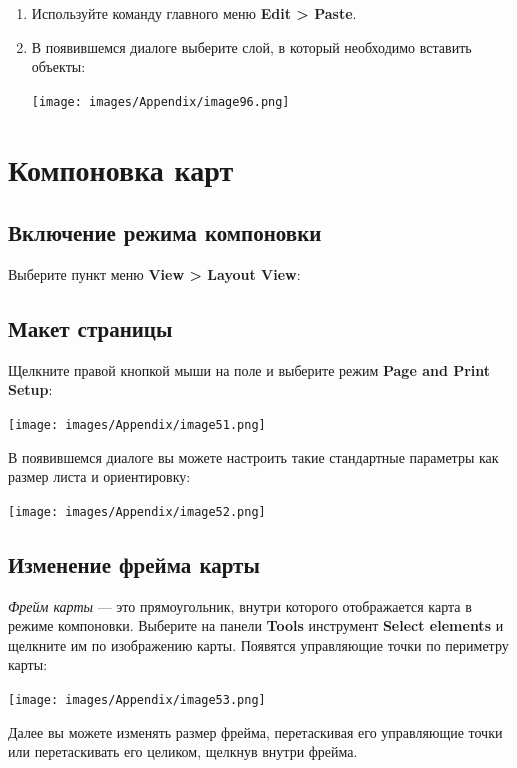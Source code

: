 \documentclass[12pt,]{book}
\begin{document}
\begin{enumerate}
\def\labelenumi{\arabic{enumi}.}
\item
  Используйте команду главного меню \textbf{Edit \textgreater{} Paste}.
\item
  В появившемся диалоге выберите слой, в который необходимо вставить объекты:

  \texttt{[image: images/Appendix/image96.png]}
\end{enumerate}

\hypertarget{manual-layout}{%
\chapter{Компоновка карт}\label{manual-layout}}

\hypertarget{section-47}{%
\section{Включение режима компоновки}\label{section-47}}

Выберите пункт меню \textbf{View \textgreater{} Layout View}:

\hypertarget{section-48}{%
\section{Макет страницы}\label{section-48}}

Щелкните правой кнопкой мыши на поле и выберите режим \textbf{Page and Print Setup}:

\texttt{[image: images/Appendix/image51.png]}

В появившемся диалоге вы можете настроить такие стандартные параметры как размер листа и ориентировку:

\texttt{[image: images/Appendix/image52.png]}

\hypertarget{section-49}{%
\section{Изменение фрейма карты}\label{section-49}}

\emph{Фрейм карты} --- это прямоугольник, внутри которого отображается карта в режиме компоновки. Выберите на панели \textbf{Tools} инструмент \textbf{Select elements} и щелкните им по изображению карты. Появятся управляющие точки по периметру карты:

\texttt{[image: images/Appendix/image53.png]}

Далее вы можете изменять размер фрейма, перетаскивая его управляющие точки или перетаскивать его целиком, щелкнув внутри фрейма.
\end{document}
